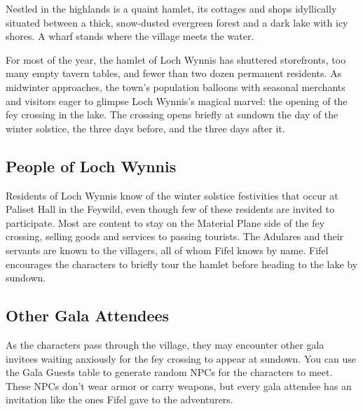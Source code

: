 \documentclass[10pt,a4paper,twoside,bg=print,twocolumn,openany,nodeprecatedcode]{dndbook}
\begin{document}
\begin{DndReadAloud}{}
Nestled in the highlands is a quaint hamlet, its cottages and shops idyllically situated between a thick, snow-dusted evergreen forest and a dark lake with icy shores. A wharf stands where the village meets the water.

\end{DndReadAloud}

For most of the year, the hamlet of Loch Wynnis has shuttered storefronts, too many empty tavern tables, and fewer than two dozen permanent residents. As midwinter approaches, the town's population balloons with seasonal merchants and visitors eager to glimpse Loch Wynnis's magical marvel: the opening of the fey crossing in the lake. The crossing opens briefly at sundown the day of the winter solstice, the three days before, and the three days after it.

\subsection{People of Loch Wynnis}
Residents of Loch Wynnis know of the winter solstice festivities that occur at Paliset Hall in the Feywild, even though few of these residents are invited to participate. Most are content to stay on the Material Plane side of the fey crossing, selling goods and services to passing tourists. The Adulares and their servants are known to the villagers, all of whom Fifel knows by name. Fifel encourages the characters to briefly tour the hamlet before heading to the lake by sundown.

\subsection{Other Gala Attendees}
As the characters pass through the village, they may encounter other gala invitees waiting anxiously for the fey crossing to appear at sundown. You can use the Gala Guests table to generate random NPCs for the characters to meet. These NPCs don't wear armor or carry weapons, but every gala attendee has an invitation like the ones Fifel gave to the adventurers.
\end{document}
